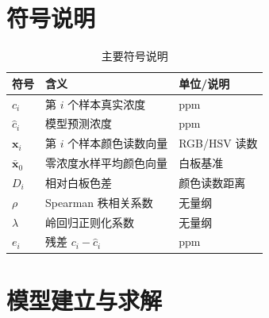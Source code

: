 \documentclass[UTF8,a4paper,12pt]{ctexart}
\begin{document}
\section{符号说明}
\begin{table}[H]\centering\caption{主要符号说明}\begin{tabular}{lll}\toprule
符号 & 含义 & 单位/说明\\\midrule
$c_i$ & 第 $i$ 个样本真实浓度 & ppm\\
$\hat c_i$ & 模型预测浓度 & ppm\\
$\bm x_i$ & 第 $i$ 个样本颜色读数向量 & RGB/HSV 读数\\
$\bar{\bm x}_0$ & 零浓度水样平均颜色向量 & 白板基准\\
$D_i$ & 相对白板色差 & 颜色读数距离\\
$\rho$ & Spearman 秩相关系数 & 无量纲\\
$\lambda$ & 岭回归正则化系数 & 无量纲\\
$e_i$ & 残差 $c_i-\hat c_i$ & ppm\\
\bottomrule\end{tabular}\end{table}
\section{模型建立与求解}
\end{document}
